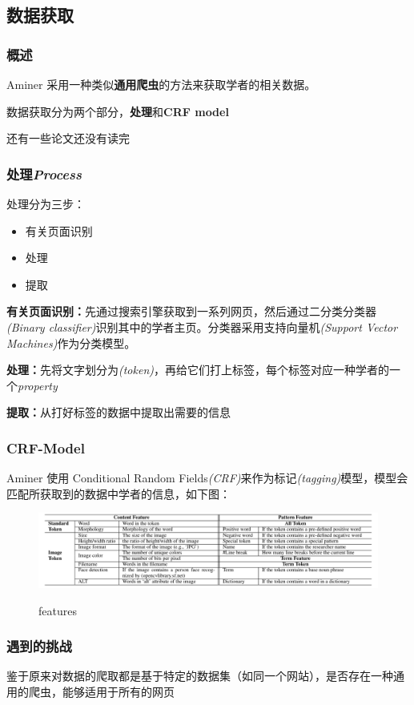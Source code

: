 \documentclass[UTF8]{ctexbeamer}
\begin{document}
\subsection{数据获取}
\begin{frame}
    \frametitle{概述}

    Aminer 采用一种类似\textbf{通用爬虫}的方法来获取学者的相关数据。\cite{tang2008arnetminer}

    {\songti 数据获取分为两个部分，\textbf{处理}和\textbf{CRF model}}

    { 还有一些论文还没有读完}


\end{frame}
\begin{frame}
    \frametitle{处理\textit{Process}}

    处理分为三步：
    \begin{itemize}
        \item 有关页面识别
        \item 处理
        \item 提取
    \end{itemize}

    \textbf{有关页面识别：}先通过搜索引擎获取到一系列网页，然后通过二分类分类器\textit{(Binary classifier)}识别其中的学者主页。分类器采用支持向量机\textit{(Support Vector Machines)}作为分类模型。


    \textbf{处理：}先将文字划分为\textit{(token)}，再给它们打上标签，每个标签对应一种学者的一个\textit{property}


    \textbf{提取：}从打好标签的数据中提取出需要的信息


\end{frame}
\begin{frame}
    \frametitle{CRF-Model}

    Aminer 使用 Conditional  Random  Fields\textit{(CRF)}来作为标记\textit{(tagging)}模型，模型会匹配所获取到的数据中学者的信息，如下图：

    \begin{figure}[h]
        \caption{features}
        \centering
        \includegraphics[width=\textwidth]{assets/figures/crfmodel.PNG}
        \label{fig:crfmodel}
    \end{figure}

\end{frame}
\begin{frame}
    \frametitle{遇到的挑战}

    鉴于原来对数据的爬取都是基于特定的数据集（如同一个网站），是否存在一种通用的爬虫，能够适用于所有的网页 \cite{tang2008arnetminer}

\end{frame}
\end{document}

